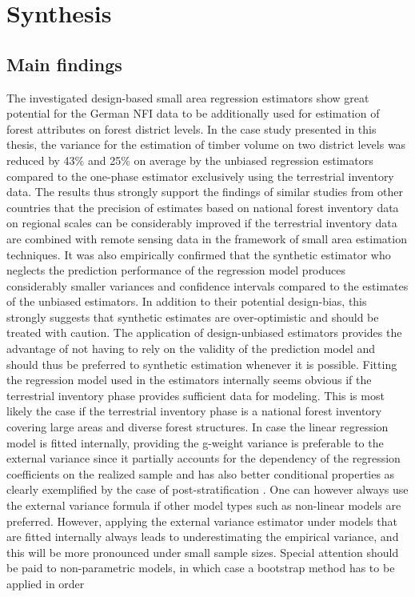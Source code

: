 	
\chapter{Synthesis}
\label{chap:synth}
\newpage



\section{Main findings}
\label{sec:synth:mainfind}

The investigated design-based small area regression estimators show great potential for the German NFI data to be additionally used for estimation of forest attributes on forest district levels. In the case study presented in this thesis, the variance for the estimation of timber volume on two district levels was reduced by 43\% and 25\% on average by the unbiased regression estimators compared to the one-phase estimator exclusively using the terrestrial inventory data. The results thus strongly support the findings of similar studies from other countries that the precision of estimates based on national forest inventory data on regional scales can be considerably improved if the terrestrial inventory data are combined with remote sensing data in the framework of small area estimation techniques. It was also empirically confirmed that the synthetic estimator who neglects the prediction performance of the regression model produces considerably smaller variances and confidence intervals compared to the estimates of the unbiased estimators. In addition to their potential design-bias, this strongly suggests that synthetic estimates are over-optimistic and should be treated with caution. The application of design-unbiased estimators provides the advantage of not having to rely on the validity of the prediction model and should thus be preferred to synthetic estimation whenever it is possible. Fitting the regression model used in the estimators internally seems obvious if the terrestrial inventory phase provides sufficient data for modeling. This is most likely the case if the terrestrial inventory phase is a national forest inventory covering large areas and diverse forest structures. In case the linear regression model is fitted internally, providing the g-weight variance is preferable to the external variance since it partially accounts for the dependency of the regression coefficients on the realized sample and has also better conditional properties as clearly exemplified by the case of post-stratification \citep{mandallaz2016}. One can however always use the external variance formula if other model types such as non-linear models are preferred. However, applying the external variance estimator under models that are fitted internally always leads to underestimating the empirical variance, and this will be more pronounced under small sample sizes. Special attention should be paid to non-parametric models, in which case a bootstrap method has to be applied in order 